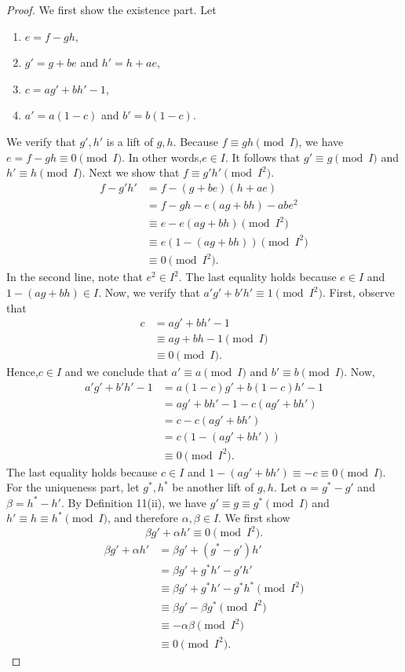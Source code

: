 \documentclass[10pt,a4paper]{article}
\begin{document}
\begin{proof}
We first show the existence part. Let
\begin{enumerate}\item $e=f-gh$,\item $g'=g+be$ and $h'=h+ae$,\item $c=ag'+bh'-1$,\item $a'=a(1-c)$ and $b'=b(1-c)$.\end{enumerate}
We verify that $g',h'$ is a lift of $g,h$. Because $f\equiv gh\pmod I$, we have $e=f-gh\equiv0\pmod I$. In other words,$e\in I$. It follows that $g'\equiv g\pmod I$ and $h'\equiv h\pmod I$.
Next we show that $f\equiv g'h'\pmod{I^2}$.
\begin{align*}f-g'h'&=f-(g+be)(h+ae)\\&=f-gh-e(ag+bh)-abe^2\\&\equiv e-e(ag+bh)\pmod{I^2}\\&\equiv e(1-(ag+bh))\pmod{I^2}\\&\equiv0\pmod{I^2}.\end{align*}
In the second line, note that $e^2\in I^2$. The last equality holds because $e\in I$ and $1-(ag+bh)\in I$.
Now, we verify that $a'g'+b'h'\equiv1\pmod{I^2}$. First, observe that
\begin{align*}c&=ag'+bh'-1\\&\equiv ag+bh-1\pmod I\\&\equiv0\pmod I.\end{align*}
Hence,$c\in I$ and we conclude that $a'\equiv a\pmod I$ and $b'\equiv b\pmod I$. Now,
\begin{align*}a'g'+b'h'-1&=a(1-c)g'+b(1-c)h'-1\\&=ag'+bh'-1-c(ag'+bh')\\&=c-c(ag'+bh')\\&=c(1-(ag'+bh'))\\&\equiv0\pmod{I^2}.\end{align*}
The last equality holds because $c\in I$ and $1-(ag'+bh')\equiv-c\equiv0\pmod I$.
For the uniqueness part, let $g^*,h^*$ be another lift of $g,h$. Let $\alpha=g^*-g'$ and $\beta=h^*-h'$. By Definition 11(ii), we have $g'\equiv g\equiv g^*\pmod I$ and $h'\equiv h\equiv h^*\pmod I$, and therefore $\alpha,\beta\in I$.
We first show
\begin{equation}\beta g'+\alpha h'\equiv0\pmod{I^2}.\tag{4}\end{equation}
\begin{align*}\beta g'+\alpha h'&=\beta g'+(g^*-g')h'\\&=\beta g'+g^*h'-g'h'\\&\equiv\beta g'+g^*h'-g^*h^*\pmod{I^2}\\&\equiv\beta g'-\beta g^*\pmod{I^2}\\&\equiv-\alpha\beta\pmod{I^2}\\&\equiv0\pmod{I^2}.\end{align*}

\end{proof}
\end{document}
